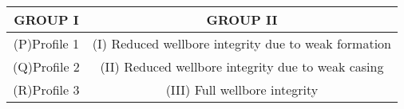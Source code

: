 \begin{tabular}[12pt]{|c|c|}
\hline
\textbf{GROUP I}&\textbf{GROUP II}\\
\hline
(P)Profile 1&(I) Reduced wellbore integrity due to weak formation\\
\hline
(Q)Profile 2&(II) Reduced wellbore integrity due to weak casing\\
\hline
(R)Profile 3&(III) Full wellbore integrity\\
\hline
\end{tabular}